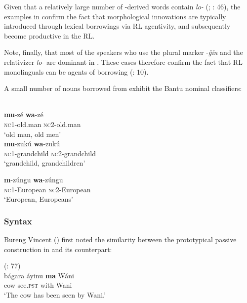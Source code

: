 \documentclass[output=paper]{langsci/langscibook}
\begin{document}
Given that a relatively large number of -derived words contain \textit{lo-} (\citealt{Miller1989}; \citealt{Manfredi2017}: 46), the examples in  confirm the fact that morphological innovations are typically introduced through lexical borrowings via {RL} agentivity, and subsequently become productive in the {RL}. 

Note, finally, that most of the speakers who use the plural marker -\textit{ǧín} and the {relativizer} \textit{lo}{}- are dominant in  . These cases therefore confirm the fact that {RL} monolinguals can be agents of borrowing (\citealt{VanCoetsem1988}: 10).

A small number of  nouns borrowed from  exhibit the Bantu nominal classifiers:

\ea

{ \citep[57]{Wellens2003}}\\
 
\ea\textbf{mu}-zé               \textbf{wa}-zé\\
 
{\textsc{nc}1-old.man   \textsc{nc2}-old.man}\\
 {`old man, old men'}\\
 
\ex
\gll  \textbf{mu}-zukú \textbf{wa}-zukú\\
          \textsc{nc}1-grandchild   \textsc{nc}2-grandchild\\
\glt       `grandchild, grandchildren'

\ex
\gll \textbf{m}-zúngu \textbf{wa}-zúngu\\
         \textsc{nc}1-European   \textsc{nc}2-European\\
\glt       `European, Europeans'
\z
\z

 \subsubsection{Syntax}

Bureng Vincent (\citeyear[77]{BurengVincent1986}) first noted the similarity between the prototypical {passive} construction in   and its  counterpart:


\ea
{  (\citealt{BurengVincent1986}: 77)}\\
\ea\gll  bágara áyinu \textbf{ma} Wáni\\
        cow see.\textsc{pst} with Wani\\
\glt      `The cow has been seen by Wani.'
\end{document}
